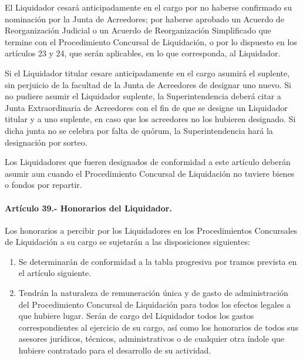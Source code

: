 \documentclass[
]{book}
\begin{document}
El Liquidador cesará anticipadamente en el cargo por no haberse confirmado su nominación por la Junta de Acreedores; por haberse aprobado un Acuerdo de Reorganización Judicial o un Acuerdo de Reorganización Simplificado que termine con el Procedimiento Concursal de Liquidación, o por lo dispuesto en los artículos 23 y 24, que serán aplicables, en lo que corresponda, al Liquidador.

Si el Liquidador titular cesare anticipadamente en el cargo asumirá el suplente, sin perjuicio de la facultad de la Junta de Acreedores de designar uno nuevo. Si no pudiere asumir el Liquidador suplente, la Superintendencia deberá citar a Junta Extraordinaria de Acreedores con el fin de que se designe un Liquidador titular y a uno suplente, en caso que los acreedores no los hubieren designado. Si dicha junta no se celebra por falta de quórum, la Superintendencia hará la designación por sorteo.

Los Liquidadores que fueren designados de conformidad a este artículo deberán asumir aun cuando el Procedimiento Concursal de Liquidación no tuviere bienes o fondos por repartir.

\hypertarget{artuxedculo-39.--honorarios-del-liquidador.}{%
\paragraph*{Artículo 39.- Honorarios del Liquidador.}\label{artuxedculo-39.--honorarios-del-liquidador.}}

Los honorarios a percibir por los Liquidadores en los Procedimientos Concursales de Liquidación a su cargo se sujetarán a las disposiciones siguientes:

\begin{enumerate}
\def\labelenumi{\arabic{enumi})}
\item
  Se determinarán de conformidad a la tabla progresiva por tramos prevista en el artículo siguiente.
\item
  Tendrán la naturaleza de remuneración única y de gasto de administración del Procedimiento Concursal de Liquidación para todos los efectos legales a que hubiere lugar.
  Serán de cargo del Liquidador todos los gastos correspondientes al ejercicio de su cargo, así como los honorarios de todos sus asesores jurídicos, técnicos, administrativos o de cualquier otra índole que hubiere contratado para el desarrollo de su actividad.
\end{enumerate}
\end{document}
